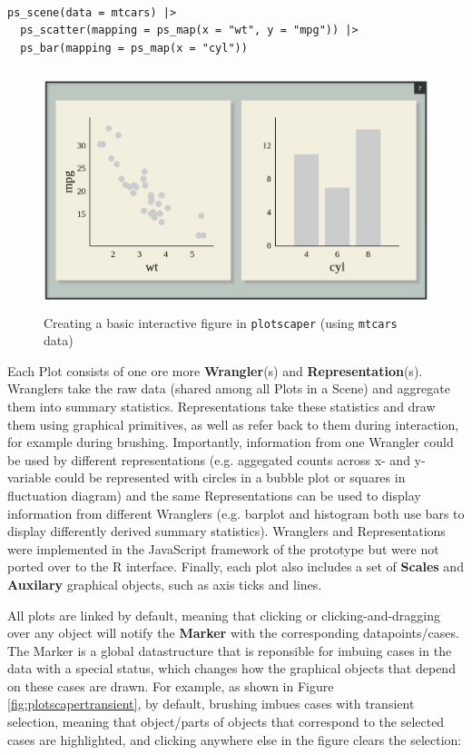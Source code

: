 \documentclass[12pt,a4paper]{article}
\begin{document}
\begin{verbatim}

ps_scene(data = mtcars) |> 
  ps_scatter(mapping = ps_map(x = "wt", y = "mpg")) |>
  ps_bar(mapping = ps_map(x = "cyl"))

\end{verbatim}

\begin{figure}[H]
\centering
\includegraphics[height=70mm]{./fig_plotscape1.png}
\caption{Creating a basic interactive figure in \texttt{plotscaper} (using \texttt{mtcars} data)}
\label{fig:plotscaperbasic}
\end{figure}

Each Plot consists of one ore more \textbf{Wrangler}(s) and \textbf{Representation}(s). Wranglers take the raw data (shared among all Plots in a Scene) and aggregate them into summary statistics. Representations take these statistics and draw them using graphical primitives, as well as refer back to them during interaction, for example during brushing. Importantly, information from one Wrangler could be used by different representations (e.g. aggegated counts across x- and y- variable could be represented with circles in a bubble plot or squares in fluctuation diagram) and the same Representations can be used to display information from different Wranglers (e.g. barplot and histogram both use bars to display differently derived summary statistics). Wranglers and Representations were implemented in the JavaScript framework of the prototype but were not ported over to the R interface. Finally, each plot also includes a set of \textbf{Scales} and \textbf{Auxilary} graphical objects, such as axis ticks and lines.      

All plots are linked by default, meaning that clicking or clicking-and-dragging over any object will notify the \textbf{Marker} with the corresponding datapoints/cases. The Marker is a global datastructure that is reponsible for imbuing cases in the data with a special status, which changes how the graphical objects that depend on these cases are drawn. For example, as shown in Figure \ref{fig:plotscapertransient}, by default, brushing imbues cases with transient selection, meaning that object/parts of objects that correspond to the selected cases are highlighted, and clicking anywhere else in the figure clears the selection:
\end{document}
